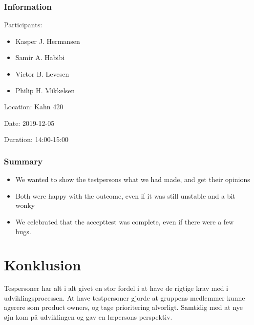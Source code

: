 \subsection{Information}
Participants:
\begin{itemize}
    \item Kasper J. Hermansen
    \item Samir A. Habibi
    \item Victor B. Levesen
    \item Philip H. Mikkelsen
\end{itemize}

Location:
Kahn 420

Date:
2019-12-05

Duration:
14:00-15:00

\subsection{Summary}

\begin{itemize}
    \item We wanted to show the testpersons what we had made, and get their opinions
    \item Both were happy with the outcome, even if it was still unstable and a bit wonky
    \item We celebrated that the accepttest was complete, even if there were a few bugs.
\end{itemize}

\chapter{Konklusion}

Tespersoner har alt i alt givet en stor fordel i at have de rigtige krav med i udviklingsprocessen. At have testpersoner gjorde at gruppens medlemmer kunne agerere som product owners, og tage prioritering alvorligt. Samtidig med at nye øjn kom på udviklingen og gav en læpersons perspektiv.